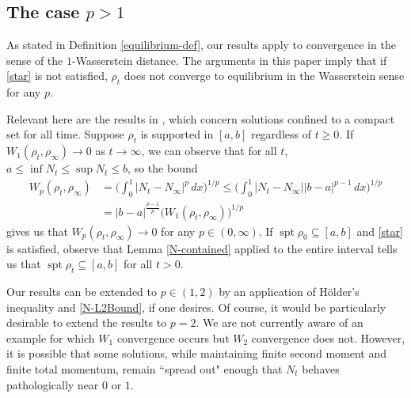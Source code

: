 \documentclass[11pt]{article}
\numberwithin{equation}{section}
\DeclareMathOperator{\spt}{spt}
\begin{document}
\subsection{The case $p>1$}\label{p>1}
    As stated in Definition \ref{equilibrium-def}, our results apply to convergence in the sense of the $1$-Wasserstein distance. The arguments in this paper imply that if \eqref{star} is not satisfied, $\rho_t$ does not converge to equilibrium in the Wasserstein sense for any $p$. 

    Relevant here are the results in \cite{Hynd-Tudorascu}, which concern solutions confined to a compact set for all time. Suppose $\rho_t$ is supported in $[a,b]$ regardless of $t\geq0$. If $W_1(\rho_t,\rho_\infty)\to0$ as $t\to\infty$, we can observe that for all $t$, $a\leq\inf N_t\leq\sup N_t\leq b$, so the bound 
    \begin{align*}
        W_p(\rho_t,\rho_\infty)&=\Big(\int_0^1|N_t-N_\infty|^p\,dx\Big)^{1/p}\leq\Big(\int_0^1|N_t-N_\infty||b-a|^{p-1}\,dx\Big)^{1/p}
        \\
        &=|b-a|^{\frac{p-1}{p}}\big(W_1(\rho_t,\rho_\infty)\big)^{1/p}
    \end{align*}
    gives us that $W_p(\rho_t,\rho_\infty)\to0$ for any $p\in(0,\infty)$. If $\spt\rho_0\subseteq[a,b]$ and \eqref{star} is satisfied, observe that Lemma \ref{N-contained} applied to the entire interval tells us that $\spt\rho_t\subseteq[a,b]$ for all $t>0$. 

    Our results can be extended to $p\in(1,2)$ by an application of Hölder's inequality and \eqref{N-L2Bound}, if one desires. Of course, it would be particularly desirable to extend the results to $p=2$. We are not currently aware of an example for which $W_1$ convergence occurs but $W_2$ convergence does not. However, it is possible that some solutions, while maintaining finite second moment and finite total momentum, remain ``spread out" enough that $N_t$ behaves pathologically near $0$ or $1$. 
    
\end{document}

